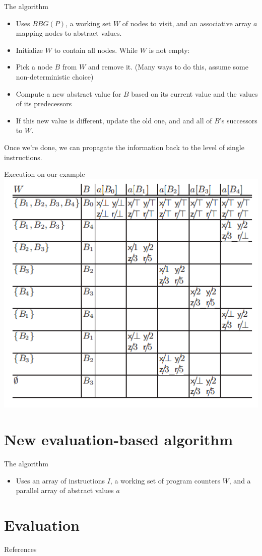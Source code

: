 \documentclass{beamer}
\begin{document}
\begin{frame}{The algorithm}
\begin{itemize}
\item Uses $BBG(P)$, a working set $W$ of nodes to visit, and an
associative array $a$ mapping nodes to abstract values.
\item Initialize $W$ to contain all nodes. While $W$ is not empty:
\item Pick a node $B$ from $W$ and remove it. (Many ways to do this, assume
some non-deterministic choice)
\item Compute a new abstract value for $B$ based on its current value and
the values of its predecessors
\item If this new value is different, update the old one, and and all of 
$B$'s successors to $W$.
\end{itemize}
Once we're done, we can propagate the information back to the level of
single instructions.
\end{frame}

\begin{frame}{Execution on our example}
\includegraphics[scale=0.5]{classic.png}
\end{frame}

\section{New evaluation-based algorithm}
\begin{frame}{The algorithm}
\begin{itemize}
\item Uses an array of instructions $I$, a working set of program counters
$W$, and a parallel array of abstract values $a$
\end{itemize}
\end{frame}
\section{Evaluation}

\begin{frame}{References}

{\footnotesize
}
\end{frame}
\end{document}
